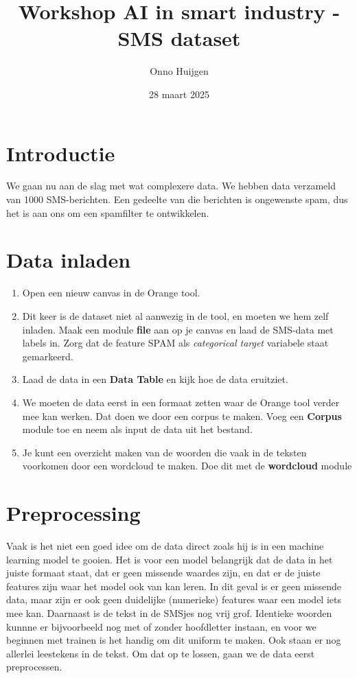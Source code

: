 \documentclass{article}
\title{Workshop AI in smart industry - SMS dataset}
\author{Onno Huijgen}
\date{28 maart 2025}
\newcommand{\tb}[1]{\textbf{#1}}
\begin{document}
\maketitle{}

\section*{Introductie}
We gaan nu aan de slag met wat complexere data. We hebben data verzameld van 1000 SMS-berichten. Een gedeelte van die berichten is ongewenste spam, dus het is aan ons om een spamfilter te ontwikkelen. 

\section{Data inladen}
\begin{enumerate}
\item Open een nieuw canvas in de Orange tool.
\item Dit keer is de dataset niet al aanwezig in de tool, en moeten we hem zelf inladen. Maak een module \tb{file} aan op je canvas en laad de SMS-data met labels in. Zorg dat de feature SPAM als \textit{categorical target} variabele staat gemarkeerd.
\item Laad de data in een \tb{Data Table} en kijk hoe de data eruitziet.
\item We moeten de data eerst in een formaat zetten waar de Orange tool verder mee kan werken. Dat doen we door een corpus te maken. Voeg een \tb{Corpus} module toe en neem als input de data uit het bestand.
\item Je kunt een overzicht maken van de woorden die vaak in de teksten voorkomen door een wordcloud te maken. Doe dit met de \tb{wordcloud} module
\end{enumerate}

\section{Preprocessing}
Vaak is het niet een goed idee om de data direct zoals hij is in een machine learning model te gooien. Het is voor een model belangrijk dat de data in het juiste formaat staat, dat er geen missende waardes zijn, en dat er de juiste features zijn waar het model ook van kan leren.
In dit geval is er geen missende data, maar zijn er ook geen duidelijke (numerieke) features waar een model iets mee kan. Daarnaast is de tekst in de SMSjes nog vrij grof. Identieke woorden kunnne er bijvoorbeeld nog met of zonder hoofdletter instaan, en voor we beginnen met trainen is het handig om dit uniform te maken. Ook staan er nog allerlei leestekens in de tekst. Om dat op te lossen, gaan we de data eerst preprocessen.
\end{document}
